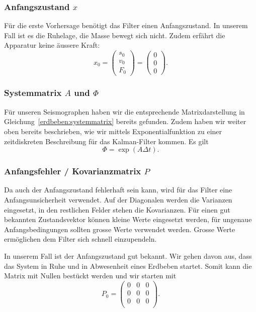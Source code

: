 \subsubsection*{Anfangszustand $x$}
Für die erste Vorhersage benötigt das Filter einen Anfangszustand.
In unserem Fall ist es die Ruhelage, die Masse bewegt sich nicht. 
Zudem erfährt die Apparatur keine äussere Kraft:
\[ {x_0 }
=
\begin{pmatrix}
{s_0}\\ {v_0}\\{F_0}
\end{pmatrix}
=
\begin{pmatrix}
0\\ 0\\ 0
\end{pmatrix}.
\]

\subsubsection*{Systemmatrix $A$ und $\Phi$}
Für unseren Seismographen haben wir die entsprechende Matrixdarstellung
in Gleichung~\eqref{erdbeben:systemmatrix} bereits gefunden.
Zudem haben wir weiter oben bereits beschrieben,
wie wir mittels Exponentialfunktion zu einer zeitdiskreten Beschreibung für das Kalman-Filter kommen.
Es gilt
\[ \Phi = \exp(A \Delta t) .\]

\subsubsection*{Anfangsfehler / Kovarianzmatrix $P$}
Da auch der Anfangszustand fehlerhaft sein kann, wird für das Filter eine Anfangsunsicherheit verwendet. 
Auf der Diagonalen werden die Varianzen eingesetzt, in den restlichen Felder stehen die Kovarianzen.
Für einen gut bekannten Zustandsvektor können kleine Werte eingesetzt werden, für ungenaue Anfangsbedingungen sollten grosse Werte verwendet werden. 
Grosse Werte ermöglichen dem Filter sich schnell einzupendeln. 

In unserem Fall ist der Anfangszustand gut bekannt. 
Wir gehen davon aus,
dass das System in Ruhe und in Abwesenheit eines Erdbeben startet.
Somit kann die Matrix mit Nullen bestückt werden und wir starten mit
\[ 
P_0 =
\begin{pmatrix}
0 & 0 &0 \\ 
0 &0 & 0 \\ 
0 & 0 &0 \\
\end{pmatrix}
.
 \] 


